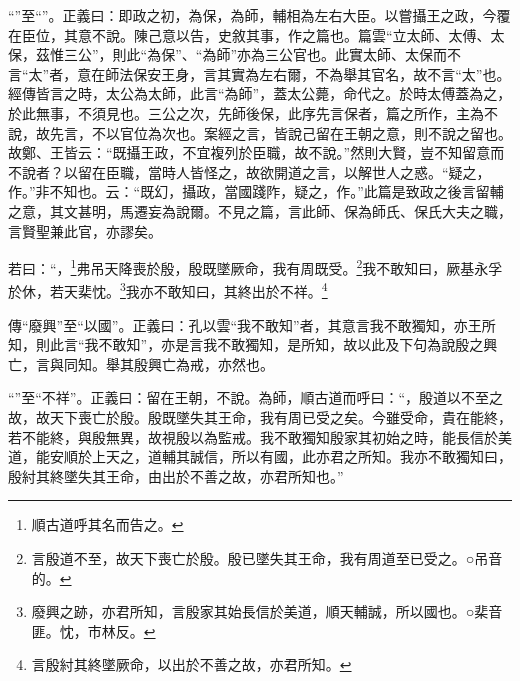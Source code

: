 {\noindent\shu{}\fzkt “”至“”。正義曰：即政之初，為保，為師，輔相為左右大臣。以嘗攝王之政，今覆在臣位，其意不說。陳己意以告，史敘其事，作之篇也。篇雲“立太師、太傅、太保，茲惟三公”，則此“為保”、“為師”亦為三公官也。此實太師、太保而不言“太”者，意在師法保安王身，言其實為左右爾，不為舉其官名，故不言“太”也。經傳皆言之時，太公為太師，此言“為師”，蓋太公薨，命代之。於時太傅蓋為之，於此無事，不須見也。三公之次，先師後保，此序先言保者，篇之所作，主為不說，故先言，不以官位為次也。案經之言，皆說己留在王朝之意，則不說之留也。故鄭、王皆云：“既攝王政，不宜複列於臣職，故不說。”然則大賢，豈不知留意而不說者？以留在臣職，當時人皆怪之，故欲開道之言，以解世人之惑。“疑之，作。”非不知也。云：“既幻，攝政，當國踐阼，疑之，作。”此篇是致政之後言留輔之意，其文甚明，馬遷妄為說爾。不見之篇，言此師、保為師氏、保氏大夫之職，言賢聖兼此官，亦謬矣。 \par}

若曰：“，\footnote{順古道呼其名而告之。}弗吊天降喪於殷，殷既墜厥命，我有周既受。\footnote{言殷道不至，故天下喪亡於殷。殷已墜失其王命，我有周道至已受之。○吊音的。}我不敢知曰，厥基永孚於休，若天棐忱。\footnote{廢興之跡，亦君所知，言殷家其始長信於美道，順天輔誠，所以國也。○棐音匪。忱，市林反。}我亦不敢知曰，其終出於不祥。\footnote{言殷紂其終墜厥命，以出於不善之故，亦君所知。}


{\noindent\zhuan{}\fzbyks 傳“廢興”至“以國”。正義曰：孔以雲“我不敢知”者，其意言我不敢獨知，亦王所知，則此言“我不敢知”，亦是言我不敢獨知，是所知，故以此及下句為說殷之興亡，言與同知。舉其殷興亡為戒，亦然也。 \par}

{\noindent\shu{}\fzkt “”至“不祥”。正義曰：留在王朝，不說。為師，順古道而呼曰：“，殷道以不至之故，故天下喪亡於殷。殷既墜失其王命，我有周已受之矣。今雖受命，貴在能終，若不能終，與殷無異，故視殷以為監戒。我不敢獨知殷家其初始之時，能長信於美道，能安順於上天之，道輔其誠信，所以有國，此亦君之所知。我亦不敢獨知曰，殷紂其終墜失其王命，由出於不善之故，亦君所知也。” \par}

